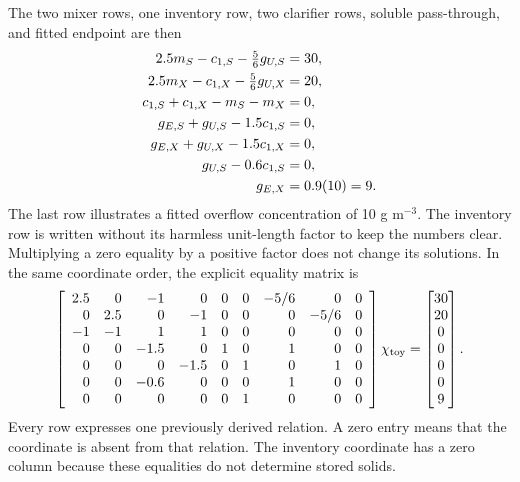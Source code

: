 The two mixer rows, one inventory row, two clarifier rows, soluble pass-through, and fitted endpoint are then
\begin{align}
\equationname{Illustrative mixer equality for the soluble component}
2.5m_S-c_{1,S}-\tfrac56g_{U,S}&=30,\\
\equationname{Illustrative mixer equality for the particulate component}
2.5m_X-c_{1,X}-\tfrac56g_{U,X}&=20,\\
\equationname{Illustrative reactor mass conservation equality}
c_{1,S}+c_{1,X}-m_S-m_X&=0,\\
\equationname{Illustrative clarifier equality for the soluble component}
g_{E,S}+g_{U,S}-1.5c_{1,S}&=0,\\
\equationname{Illustrative clarifier equality for the particulate component}
g_{E,X}+g_{U,X}-1.5c_{1,X}&=0,\\
\equationname{Illustrative soluble underflow transport equality}
g_{U,S}-0.6c_{1,S}&=0,\\
\equationname{Illustrative empirical overflow-solids equality}
g_{E,X}&=0.9(10)=9.
\end{align}
The last row illustrates a fitted overflow concentration of 10 g m$^{-3}$. The inventory row is written without its harmless unit-length factor to keep the numbers clear. Multiplying a zero equality by a positive factor does not change its solutions. In the same coordinate order, the explicit equality matrix is
\begin{equation}
\equationname{Matrix form of the illustrative plant projection equalities}
\left[\begin{array}{rrrrrrrrr}
2.5&0&-1&0&0&0&-5/6&0&0\\
0&2.5&0&-1&0&0&0&-5/6&0\\
-1&-1&1&1&0&0&0&0&0\\
0&0&-1.5&0&1&0&1&0&0\\
0&0&0&-1.5&0&1&0&1&0\\
0&0&-0.6&0&0&0&1&0&0\\
0&0&0&0&0&1&0&0&0
\end{array}\right]\chi_{\rm toy}
=\begin{bmatrix}30\\20\\0\\0\\0\\0\\9\end{bmatrix}.
\end{equation}
Every row expresses one previously derived relation. A zero entry means that the coordinate is absent from that relation. The inventory coordinate has a zero column because these equalities do not determine stored solids.

